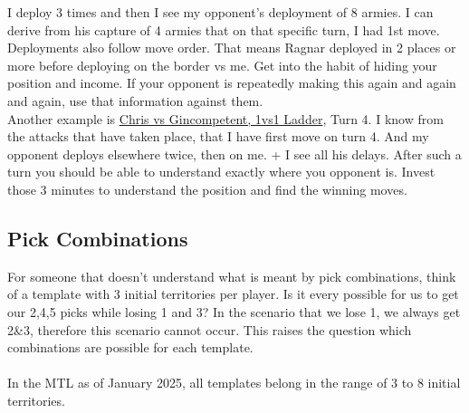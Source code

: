 I deploy 3 times and then I see my opponent's deployment of 8 armies. I can derive from his capture of 4 armies that on that specific turn, I had 1st move. Deployments also follow move order. That means Ragnar deployed in 2 places or more before deploying on the border vs me. Get into the habit of hiding your position and income. If your opponent is repeatedly making this again and again and again, use that information against them.
\\
Another example is \href{https://www.warzone.com/MultiPlayer?GameID=36233122}{Chris vs Gincompetent, 1vs1 Ladder}, Turn 4. I know from the attacks that have taken place, that I have first move on turn 4. And my opponent deploys elsewhere twice, then on me. + I see all his delays. After such a turn you should be able to understand exactly where you opponent is. Invest those 3 minutes to understand the position and find the winning moves.
\subsection{Pick Combinations}

For someone that doesn't understand what is meant by pick combinations, think of a template with 3 initial territories per player. Is it every possible for us to get our 2,4,5 picks while losing 1 and 3? In the scenario that we lose 1, we always get 2\&3, therefore this scenario cannot occur. This raises the question which combinations are possible for each template.
\\
\\
In the MTL as of January 2025, all templates belong in the range of 3 to 8 initial territories.

